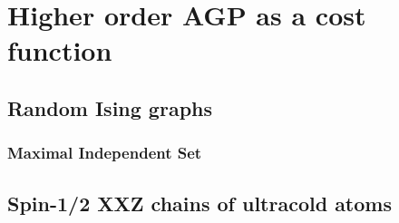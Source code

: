 \chapter{Higher order AGP as a cost function}

\section{Random Ising graphs}

\subsection{Maximal Independent Set}

\section{Spin-1/2 XXZ chains of ultracold atoms}